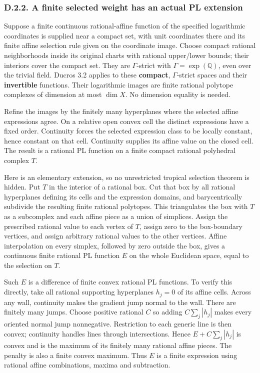 \documentclass[
  10pt,
]{article}
\begin{document}
\subsubsection{D.2.2. A finite selected weight has an actual PL
extension}\label{d.2.2.-a-finite-selected-weight-has-an-actual-pl-extension}

Suppose a finite continuous rational-affine function of the specified
logarithmic coordinates is supplied near a compact set, with unit
coordinates there and its finite affine selection rule given on the
coordinate image. Choose compact rational neighborhoods inside its
original charts with rational upper/lower bounds; their interiors cover
the compact set. They are \(\Gamma\)-strict with
\(\Gamma=\exp(\mathbb Q)\), even over the trivial field. Ducros 3.2
applies to these \textbf{compact}, \(\Gamma\)-strict spaces and their
\textbf{invertible} functions. Their logarithmic images are finite
rational polytope complexes of dimension at most \(\dim X\). No
dimension equality is needed.

Refine the images by the finitely many hyperplanes where the selected
affine expressions agree. On a relative open convex cell the distinct
expressions have a fixed order. Continuity forces the selected
expression class to be locally constant, hence constant on that cell.
Continuity supplies its affine value on the closed cell. The result is a
rational PL function on a finite compact rational polyhedral complex
\(T\).

Here is an elementary extension, so no unrestricted tropical selection
theorem is hidden. Put \(T\) in the interior of a rational box. Cut that
box by all rational hyperplanes defining its cells and the expression
domains, and barycentrically subdivide the resulting finite rational
polytopes. This triangulates the box with \(T\) as a subcomplex and each
affine piece as a union of simplices. Assign the prescribed rational
value to each vertex of \(T\), assign zero to the box-boundary vertices,
and assign arbitrary rational values to the other vertices. Affine
interpolation on every simplex, followed by zero outside the box, gives
a continuous finite rational PL function \(E\) on the whole Euclidean
space, equal to the selection on \(T\).

Such \(E\) is a difference of finite convex rational PL functions. To
verify this directly, take all rational supporting hyperplanes \(h_j=0\)
of its affine cells. Across any wall, continuity makes the gradient jump
normal to the wall. There are finitely many jumps. Choose positive
rational \(C\) so adding \(C\sum_j|h_j|\) makes every oriented normal
jump nonnegative. Restriction to each generic line is then convex;
continuity handles lines through intersections. Hence \(E+C\sum_j|h_j|\)
is convex and is the maximum of its finitely many rational affine
pieces. The penalty is also a finite convex maximum. Thus \(E\) is a
finite expression using rational affine combinations, maxima and
subtraction.
\end{document}
